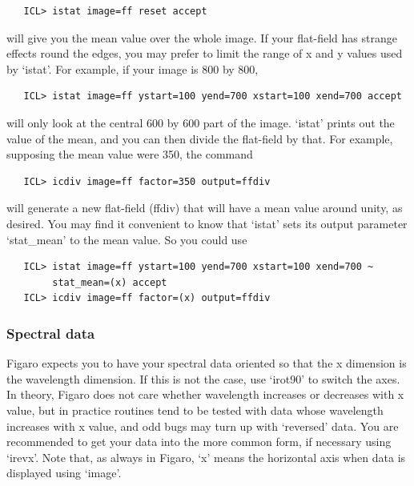 \documentclass[11pt,twoside]{article}
\begin{document}
\begin{verbatim}
   ICL> istat image=ff reset accept
\end{verbatim}

   will give you the mean value over the whole image.  If your
   flat-field has strange effects round the edges, you may prefer to
   limit the range of x and y values used by `istat'.  For example, if
   your image is 800 by 800,

\begin{verbatim}
   ICL> istat image=ff ystart=100 yend=700 xstart=100 xend=700 accept
\end{verbatim}

   will only look at the central 600 by 600 part of the image. `istat'
   prints out the value of the mean, and you can then divide the
   flat-field by that. For example, supposing the mean value were 350,
   the command

\begin{verbatim}
   ICL> icdiv image=ff factor=350 output=ffdiv
\end{verbatim}

   will generate a new flat-field (ffdiv) that will have a mean value
   around unity, as desired.  You may find it convenient to know that
   `istat' sets its output parameter `stat\_mean' to the mean value.
   So you could use

\begin{verbatim}
   ICL> istat image=ff ystart=100 yend=700 xstart=100 xend=700 ~
        stat_mean=(x) accept
   ICL> icdiv image=ff factor=(x) output=ffdiv
\end{verbatim}


\subsubsection{\label{techno1spectrum}Spectral data}

   Figaro expects you to have your spectral data oriented so that the x
   dimension is the wavelength dimension.  If this is not the case, use
   `irot90' to switch the axes.  In theory, Figaro does not care
   whether wavelength increases or decreases with x value, but in
   practice routines tend to be tested with data whose wavelength
   increases with x value, and odd bugs may turn up with `reversed'
   data.  You are recommended to get your data into the more common
   form, if necessary using `irevx'.  Note that, as always in Figaro,
   `x' means the horizontal axis when data is displayed using
   `image'.
\end{document}
